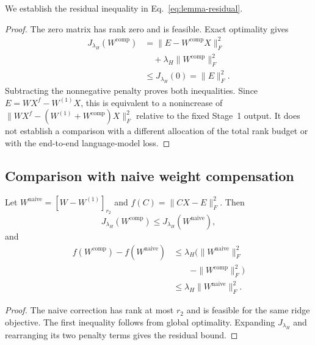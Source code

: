 We establish the residual inequality in Eq.~\eqref{eq:lemma-residual}.

\begin{proof}
The zero matrix has rank zero and is feasible. Exact optimality gives
\begin{equation}
\begin{aligned}
J_{\lambda_H}(W^{\mathrm{comp}})
&=\|E-W^{\mathrm{comp}}X\|_F^2\\
&\quad+\lambda_H\|W^{\mathrm{comp}}\|_F^2\\
&\le J_{\lambda_H}(0)=\|E\|_F^2.
\end{aligned}
\end{equation}
Subtracting the nonnegative penalty proves both inequalities. Since $E=WX^f-W^{(1)}X$, this is equivalent to a nonincrease of $\|WX^f-(W^{(1)}+W^{\mathrm{comp}})X\|_F^2$ relative to the fixed Stage~1 output. It does not establish a comparison with a different allocation of the total rank budget or with the end-to-end language-model loss.
\end{proof}

\subsection{Comparison with naive weight compensation}\label{sup:proof-corollary1}

\begin{corollary*}
Let $W^{\mathrm{naive}}=[W-W^{(1)}]_{r_2}$ and $f(C)=\|CX-E\|_F^2$. Then
\begin{equation}
J_{\lambda_H}(W^{\mathrm{comp}})
\le J_{\lambda_H}(W^{\mathrm{naive}}),
\end{equation}
and
\begin{equation}
\begin{aligned}
f(W^{\mathrm{comp}})-f(W^{\mathrm{naive}})
&\le\lambda_H\big(\|W^{\mathrm{naive}}\|_F^2 \\
&\qquad-\|W^{\mathrm{comp}}\|_F^2\big) \\
&\le\lambda_H\|W^{\mathrm{naive}}\|_F^2.
\end{aligned}
\end{equation}
\end{corollary*}

\begin{proof}
The naive correction has rank at most $r_2$ and is feasible for the same ridge objective. The first inequality follows from global optimality. Expanding $J_{\lambda_H}$ and rearranging its two penalty terms gives the residual bound.
\end{proof}

